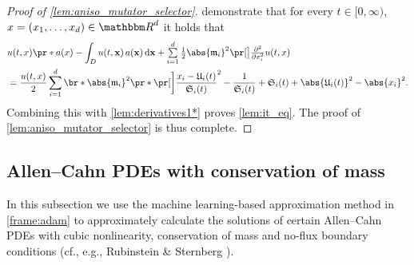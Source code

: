\begin{proof}[Proof of \cref{lem:aniso_mutator_selector}]
	demonstrate that 
		for every
			$t \in [0,\infty)$,
			$x = (x_1, \dots,x_d)\in \R^d$
		it holds that
		\begin{equation}
		\begin{aligned}
			& u(t,x)\pr*{a(x) - \int_{D} u(t,\mathbf{x})\, a(\mathbf{x}) \, \diff\mathbf{x} } + \smallsuml_{i=1}^{d} \tfrac{1}{2} \abs{\mathfrak{m}_i}^2 \bpr{\tfrac{\partial^2 }{\partial x_i^2} u} (t,x) 
			\\ &= 
			\frac{u(t,x)}{2} \sum_{i=1}^d \br*{  \abs{\mathfrak{m}_i}^2  \pr*{ \bbbpr{\frac{x_i - \mathfrak{U}_i(t)}{\mathfrak{S}_i(t)}}^{2} - \frac{1}{\mathfrak{S}_i(t)} } + \mathfrak{S}_i(t) + \abs{\mathfrak{U}_i(t)}^2 - \abs{x_i}^2 }
			.
		\end{aligned}
		\end{equation}
	Combining 
		this 
	with 
		\eqref{lem:derivatives1*} 
	proves \cref{lem:it_eq}. 
	The proof of \cref{lem:aniso_mutator_selector} is thus complete.
\end{proof}

\subsection{Allen--Cahn PDEs with conservation of mass}
\label{subsec:allen_cahn}
%
In this subsection we use the machine learning-based approximation method in \cref{frame:adam}
to approximately calculate the solutions of certain Allen--Cahn PDEs with cubic nonlinearity, conservation of mass and no-flux boundary conditions (cf., e.g., Rubinstein \& Sternberg \citep{RUBINSTEIN1992}).

